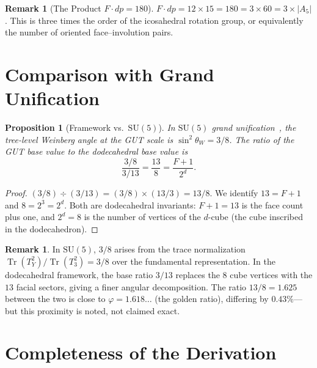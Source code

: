 \documentclass[11pt,a4paper]{article}
\theoremstyle{plain}
\newtheorem{proposition}[theorem]{Proposition}
\theoremstyle{definition}
\newtheorem{remark}[theorem]{Remark}
\newcommand{\sw}{\sin^{2}\!\theta_{W}}
\newcommand{\Tr}{\operatorname{Tr}}
\newcommand{\vp}{\varphi}
\begin{document}
\begin{remark}[The Product $F \cdot dp = 180$]\label{rem:180}
$F \cdot dp = 12 \times 15 = 180 = 3 \times 60 = 3 \times |A_{5}|$.
This is three times the order of the icosahedral rotation group, or
equivalently the number of oriented face--involution pairs.
\end{remark}

\section{Comparison with Grand Unification}\label{sec:gut}

\begin{proposition}[Framework vs.\ $\mathrm{SU}(5)$]\label{prop:gut}
In $\mathrm{SU}(5)$ grand unification~\cite{georgi1974}, the tree-level
Weinberg angle at the GUT scale is $\sw = 3/8$.  The ratio of the GUT
base value to the dodecahedral base value is
\begin{equation}\label{eq:gut-ratio}
  \frac{3/8}{3/13} = \frac{13}{8} = \frac{F + 1}{2^{d}}.
\end{equation}
\end{proposition}

\begin{proof}
$(3/8) \div (3/13) = (3/8) \times (13/3) = 13/8$.
We identify $13 = F + 1$ and $8 = 2^{3} = 2^{d}$.  Both are
dodecahedral invariants: $F + 1 = 13$ is the face count plus one, and
$2^{d} = 8$ is the number of vertices of the $d$-cube (the cube
inscribed in the dodecahedron).
\end{proof}

\begin{remark}\label{rem:gut-meaning}
In $\mathrm{SU}(5)$, $3/8$ arises from the trace normalization
$\Tr(T_{Y}^{2})/\Tr(T_{3}^{2}) = 3/8$ over the fundamental
representation.  In the dodecahedral framework, the base ratio $3/13$
replaces the $8$ cube vertices with the $13$ facial sectors, giving a
finer angular decomposition.  The ratio $13/8 = 1.625$ between the two
is close to $\vp = 1.618\ldots$ (the golden ratio), differing by
$0.43\%$---but this proximity is noted, not claimed exact.
\end{remark}

\section{Completeness of the Derivation}\label{sec:completeness}
\end{document}
